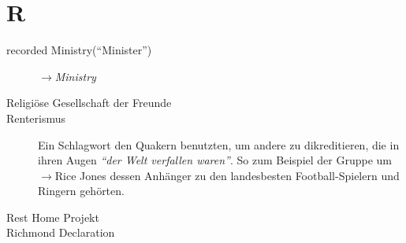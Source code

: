 \section*{R}

\articlesize

\begin{description}

 \item[recorded Ministry("`Minister"')] $\to$\textit{Ministry}

 \item[Religiöse Gesellschaft der Freunde]

 \item[Renterismus] Ein Schlagwort den Quakern benutzten, um andere zu dikreditieren, die in ihren Augen \textit{"`der Welt verfallen waren"'}. So zum Beispiel der Gruppe um   $\to$Rice Jones dessen Anhänger zu den landesbesten Football-Spielern und Ringern gehörten.

 \item[Rest Home Projekt]

 \item[Richmond Declaration]

 \end{description}

\normalsize
